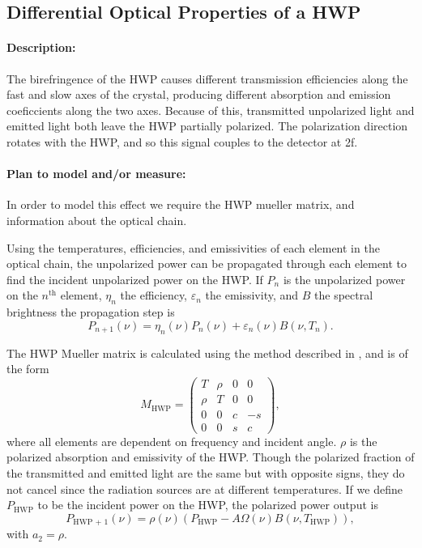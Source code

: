 
\subsection{Differential Optical Properties of a HWP}

\paragraph{Description:}
The birefringence of the HWP causes different transmission efficiencies along the fast and slow axes of the crystal,
producing different absorption and emission coeficcients along the two axes.
Because of this, transmitted unpolarized light and emitted light both leave the HWP partially polarized.
The polarization direction rotates with the HWP, and so this signal couples to the detector at 2f.


\paragraph{Plan to model and/or measure:}
In order to model this effect we require the HWP mueller matrix, and information about the optical chain.

Using the temperatures, efficiencies, and emissivities of each element in the optical chain,
the unpolarized power can be propagated through each element to find the incident unpolarized power on the HWP.
If $P_n$ is the unpolarized power on the $n^\text{th}$ element, $\eta_n$ the efficiency, $\varepsilon_n$ the emissivity, and $B$ the spectral brightness
the propagation step is 
\begin{equation}
\label{unpolarized_propagation}
P_{n+1}(\nu) = \eta_n(\nu) P_n(\nu) + \varepsilon_n(\nu) B(\nu, T_n) .
\end{equation}


The HWP Mueller matrix is calculated using the method described in \cite{Salatino16}, and is of the form
\[
M_\text{HWP} = \left(
\begin{array}{cccc}
T & \rho & 0 & 0\\
\rho & T & 0 & 0\\
0 & 0 & c & -s \\
0 & 0 & s & c
\end{array}
\right),
\]
where all elements are dependent on frequency and incident angle.
$\rho$ is the polarized absorption and emissivity of the HWP.
Though the polarized fraction of the transmitted and emitted light are the same but with opposite signs,
they do not cancel since the radiation sources are at different temperatures.
If we define $P_\text{HWP}$ to be the incident power on the HWP, the polarized power output is 
\begin{equation}
P_\text{HWP + 1}(\nu) = \rho(\nu)(P_\text{HWP} - A\Omega(\nu)B(\nu, T_\text{HWP})),
\end{equation}
with $a_2 = \rho$. 

